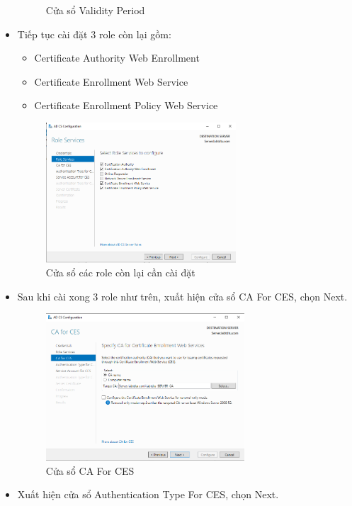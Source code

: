 \documentclass[13pt]{report}
\begin{document}
\begin{itemize}
\begin{figure}[htp]
			\caption{Cửa sổ Validity Period}
		\end{figure}
		\item Tiếp tục cài đặt 3 role còn lại gồm:
		\begin{itemize} 
			\item Certificate Authority Web Enrollment
			\item Certificate Enrollment Web Service
			\item Certificate Enrollment Policy Web Service
		\end{itemize}
		\begin{figure}[htp]
			\centering
			\includegraphics[width=0.67\textwidth]{image/Gui/ADCS/22.png}
			\caption{Cửa sổ các role còn lại cần cài đặt}
		\end{figure}
		\newpage
		\item Sau khi cài xong 3 role như trên, xuất hiện cửa sổ CA For CES, chọn Next.
		\begin{figure}[htp]
			\centering
			\includegraphics[width=0.7\textwidth]{image/Gui/ADCS/23.png}
			\caption{Cửa sổ CA For CES}
		\end{figure}
		\item Xuất hiện cửa sổ Authentication Type For CES, chọn Next.
		\begin{figure}[htp]

\end{figure}
\end{itemize}
\end{document}
